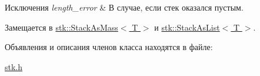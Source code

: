 \begin{DoxyExceptions}{Исключения}
{\em length\+\_\+error} & В случае, если стек оказался пустым. \\
\hline
\end{DoxyExceptions}


Замещается в \hyperlink{classstk_1_1_stack_as_mass_a6b1b18b02db67e82ed6abbcfdc8ede1e}{stk\+::\+Stack\+As\+Mass$<$ T $>$} и \hyperlink{classstk_1_1_stack_as_list_a12cfaa9a9a137c07258aec159779cd1e}{stk\+::\+Stack\+As\+List$<$ T $>$}.



Объявления и описания членов класса находятся в файле\+:\begin{DoxyCompactItemize}
\item 
\hyperlink{stk_8h}{stk.\+h}\end{DoxyCompactItemize}
